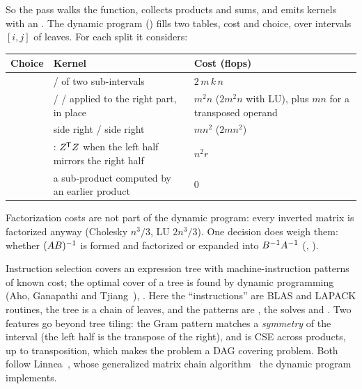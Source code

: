 So the pass walks the function, collects products and sums, and emits
kernels with an . The dynamic program
() fills two tables, cost and
choice, over intervals \([i,j]\) of leaves. For each split it considers:

\begin{center}\small
\begin{tabularx}{\linewidth}{@{}P{3.4cm}P{4.4cm}L@{}}
\toprule
\textbf{Choice} & \textbf{Kernel} & \textbf{Cost (flops)} \\
\midrule
{} &  /  of two sub-intervals & \(2\,m\,k\,n\) \\
 &  /  /  applied to the right part, in place & \(m^2 n\) (\(2m^2 n\) with LU), plus \(mn\) for a transposed operand \\
 &  side right /  side right & \(mn^2\) (\(2mn^2\)) \\
 & : \(Z^{\mkern-1.5mu\mathsf{T}} Z\) when the left half mirrors the right half & \(n^2 r\) \\
 & a sub-product computed by an earlier product & 0 \\
\bottomrule
\end{tabularx}
\end{center}

Factorization costs are not part of the dynamic program: every inverted
matrix is factorized anyway (Cholesky \(n^3/3\), LU \(2n^3/3\)). One
decision does weigh them: whether \((AB)^{-1}\) is formed and factorized or
expanded into \(B^{-1} A^{-1}\) (,
).

\begin{theory}
Instruction selection covers an expression tree with machine-instruction
patterns of known cost; the optimal cover of a tree is found by dynamic
programming (Aho, Ganapathi and Tjiang~\cite{aho-ganapathi-tjiang}),
.
Here the ``instructions'' are BLAS and LAPACK routines, the tree is a chain
of leaves, and the patterns are , the solves and .
Two features go beyond tree tiling: the Gram pattern matches a
\emph{symmetry} of the interval (the left half is the transpose of the
right), and  is CSE across products, up to transposition, which
makes the problem a DAG covering problem. Both follow Linnea~\cite{linnea},
whose generalized matrix chain algorithm~\cite{gmc} the dynamic program
implements.
\end{theory}

